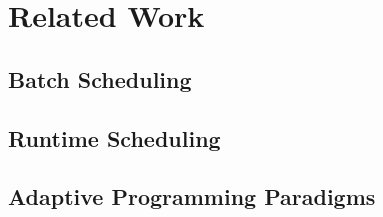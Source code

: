 \chapter{Related Work}\label{chapter:related work}
\section{Batch Scheduling}
\section{Runtime Scheduling}
\section{Adaptive Programming Paradigms}
